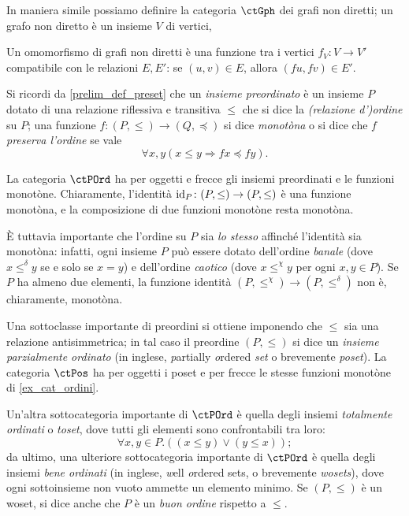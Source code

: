 \begin{example}\label{ex_cat_grafi_nondiretti}
 In maniera simile possiamo definire la categoria \(\ctGph\) dei grafi non diretti; un grafo non diretto è un insieme \(V\) di vertici,  %

 Un omomorfismo di grafi non diretti è una funzione tra i vertici \(f_V \colon V\to V'\) compatibile con le relazioni \(E,E'\): se \((u,v)\in E\), allora \((fu,fv)\in E'\).
\end{example}
\begin{example}\label{ex_cat_ordini}
 Si ricordi da \ref{prelim_def_preset} che un \emph{insieme preordinato} è un insieme \(P\) dotato di una relazione riflessiva e transitiva \(\le\) che si dice la \emph{(relazione d')ordine} su \(P\); una funzione \(f \colon (P,\le)\to (Q,\preceq)\) si dice \emph{monotòna} o si dice che \(f\) \emph{preserva l'ordine} se vale
 \[\forall x,y(x\le y\Rightarrow fx\preceq fy).\]

 La categoria \(\ctPOrd\) ha per oggetti e frecce gli insiemi preordinati e le funzioni monotòne. Chiaramente, l'identità \(\mathrm{id}_P \colon (P,\le)\to (P,\le)\) è una funzione monotòna, e la composizione di due funzioni monotòne resta monotòna.

 È tuttavia importante che l'ordine su \(P\) sia \emph{lo stesso} affinché l'identità sia monotòna: infatti, ogni insieme \(P\) può essere dotato dell'ordine \emph{banale} (dove \(x \mathrel{\le^\delta} y\) se e solo se \(x=y\)) e dell'ordine \emph{caotico} (dove \(x\mathrel{\le^\chi} y\) per ogni \(x,y\in P\)). Se \(P\) ha almeno due elementi, la funzione identità \((P,\le^\chi)\to (P,\le^\delta)\) non è, chiaramente, monotòna.
\end{example}
\begin{remark}[po, wo e to]\label{po_wo_to}
 Una sottoclasse importante di preordini si ottiene imponendo che \(\le\) sia una relazione antisimmetrica; in tal caso il preordine \((P,\le)\) si dice un \emph{insieme parzialmente ordinato} (in inglese, \emph{p}artially \emph{o}rdered \emph{set} o brevemente \emph{poset}). La categoria \(\ctPos\) ha per oggetti i poset e per frecce le stesse funzioni monotòne di \ref{ex_cat_ordini}.

 Un'altra sottocategoria importante di \(\ctPOrd\) è quella degli insiemi \emph{totalmente ordinati} o \emph{toset}, dove tutti gli elementi sono confrontabili tra loro:
 \[\forall x,y\in P.((x\le y)\lor (y\le x));\]
 da ultimo, una ulteriore sottocategoria importante di \(\ctPOrd\) è quella degli insiemi \emph{bene ordinati} (in inglese, \emph{w}ell \emph{o}rdered sets, o brevemente \emph{wosets}), dove ogni sottoinsieme non vuoto ammette un elemento minimo. Se \((P,\le)\) è un woset, si dice anche che \(P\) è un \emph{buon ordine} rispetto a \(\le\).
\end{remark}
